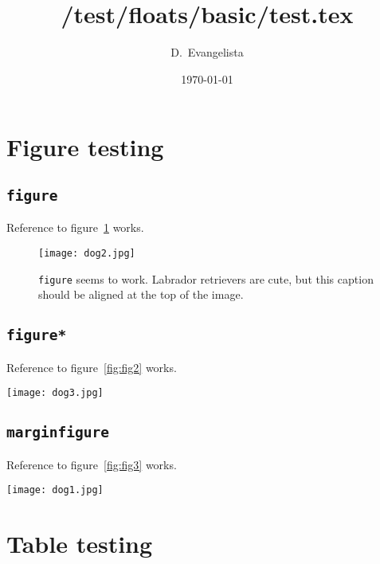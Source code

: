 \documentclass{article}
\title{/test/floats/basic/test.tex}
\author{D.~Evangelista}
\date{\today}
\begin{document}
\maketitle

\section{Figure testing}
\subsection{\texttt{figure}}
Reference to figure~\ref{fig:fig1} works.
\begin{figure}[h]
\begin{center}
\texttt{[image: dog2.jpg]}
\end{center}
\caption{\texttt{figure} seems to work. Labrador retrievers are cute, but this caption should be aligned at the top of the image.}
\label{fig:fig1}
\end{figure}

\subsection{\texttt{figure*}}
Reference to figure~\ref{fig:fig2} works.
\begin{figure*}[h]
\begin{center}
\texttt{[image: dog3.jpg]}
\end{center}
\caption{\texttt{figure*} also seems to work, but the width is not as wide as expected when using textwidth or columnwidth? hmmm.}
\label{fig:fig2}
\end{figure*}

\subsection{\texttt{marginfigure}}
Reference to figure~\ref{fig:fig3} works.
\begin{marginfigure}
\begin{center}
\texttt{[image: dog1.jpg]}
\end{center}
\caption{\texttt{marginfigure} here. Puppies are cute.}
\label{fig:fig3}
\end{marginfigure}

\clearpage
\section{Table testing}
\end{document}
